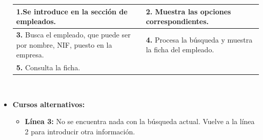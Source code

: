 \documentclass[spanish,a4paper,11pt, twoside]{report}	%
\begin{document}
\begin{itemize}
\begin{tabular}{|p{6cm}||p{6cm}|}
				\textbf{1.}Se introduce en la sección de empleados. & \textbf{2.} Muestra las opciones correspondientes. \\ \hline
				\textbf{3.} Busca el empleado, que puede ser por nombre, NIF, puesto en la
						empresa. & \textbf{4.} Procesa la búsqueda y muestra la ficha del empleado. \\
				\hline \textbf{5.} Consulta la ficha.  & \textbf{} \\ \hline
			\end{tabular}
			\\
			\item \textbf{Cursos alternativos:} 
			\begin{itemize}
			\item  \textbf{Línea 3:} No se encuentra nada con la búsqueda actual. Vuelve a la línea 2 para introducir otra información.
			\end {itemize}
		\end{itemize}

\end{document}
